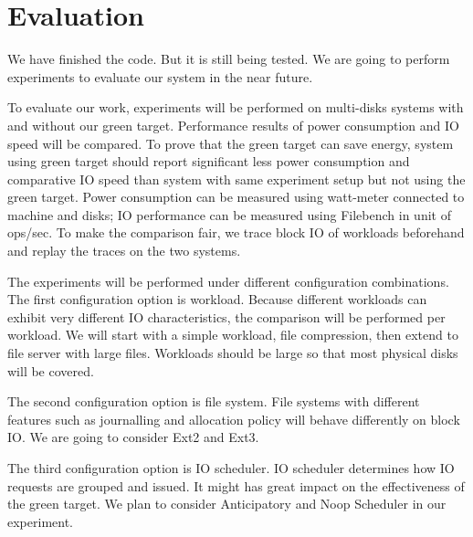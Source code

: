 \section{Evaluation}
\label{sec:eval}

We have finished the code. But it is still being tested. We are going
to perform experiments to evaluate our system in the near future.

To evaluate our work, experiments will be performed on multi-disks
systems with and without our green target. Performance results of
power consumption and IO speed will be compared. To prove that the
green target can save energy, system using green target should report
significant less power consumption and comparative IO speed than
system with same experiment setup but not using the green target.
Power consumption can be measured using watt-meter connected to
machine and disks; IO performance can be measured using Filebench in
unit of ops/sec. To make the comparison fair, we trace block IO of
workloads beforehand and replay the traces on the two systems. 

The experiments will be performed under different configuration
combinations. The first configuration option is workload. Because
different workloads can exhibit very different IO characteristics, the
comparison will be performed per workload. We will start with a simple
workload, file compression, then extend to file server with large
files. Workloads should be large so that most physical disks will be
covered. 

The second configuration option is file system. File systems with
different features such as journalling and allocation policy will
behave differently on block IO. We are going to consider Ext2 and
Ext3. 

The third configuration option is IO scheduler. IO scheduler
determines how IO requests are grouped and issued. It might has great
impact on the effectiveness of the green target. We plan to consider
Anticipatory and Noop Scheduler in our experiment. 

